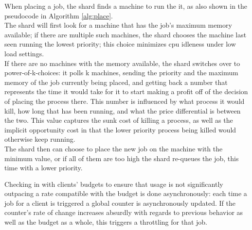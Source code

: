 When placing a job, the shard finds a machine to run the it, as also shown in
the pseudocode in Algorithm \ref{alg:place}. \\
The shard will first look for a machine that has the job's maximum memory
available; if there are multiple such machines, the shard chooses the machine
last seen running the lowest priority; this choice minimizes cpu idleness under
low load settings. \\
If there are no machines with the memory available, the shard switches over to
power-of-k-choices: it polls k machines, sending the priority and the maximum
memory of the job currently being placed, and getting back a number that
represents the time it would take for it to start making a profit off of the
decision of placing the process there. This number is influenced by what process
it would kill, how long that has been running, and what the price differential
is between the two. This value captures the sunk cost of killing a process, as
well as the implicit opportunity cost in that the lower priority process being
killed would otherwise keep running. \\ 
The shard then can choose to place the new job on the machine with the minimum
value, or if all of them are too high the shard re-queues the job, this time
with a lower priority.

Checking in with clients' budgets to ensure that usage is not significantly
outpacing a rate compatible with the budget is done asynchronously: each time a
job for a client is triggered a global counter is asynchronously updated. If the
counter's rate of change increases absurdly with regards to previous behavior as
well as the budget as a whole, this triggers a throttling for that job.
